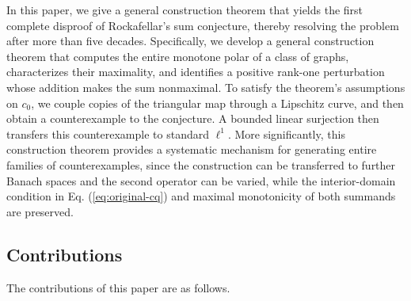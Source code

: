 \documentclass[11pt]{article}
\theoremstyle{definition}
\theoremstyle{remark}
\begin{document}
In this paper, we give a general construction theorem that yields the first complete disproof of Rockafellar's sum conjecture, thereby resolving the problem after more than five decades. 
Specifically, we develop a general construction theorem that computes the entire monotone polar of a class of graphs, characterizes their maximality, and identifies a positive rank-one perturbation whose addition makes the sum nonmaximal. To satisfy the theorem's assumptions on $c_0$, we couple copies of the triangular map through a Lipschitz curve, and then obtain a counterexample to the conjecture. A bounded linear surjection then transfers this counterexample to standard $\ell^1$. More significantly, this construction theorem provides a systematic mechanism for generating entire families of counterexamples, since the construction can be transferred to further Banach spaces and the second operator can be varied, while the interior-domain condition in Eq. (\ref{eq:original-cq}) and maximal monotonicity of both summands are preserved.








\subsection{Contributions}
The contributions of this paper are as follows. 
\end{document}
